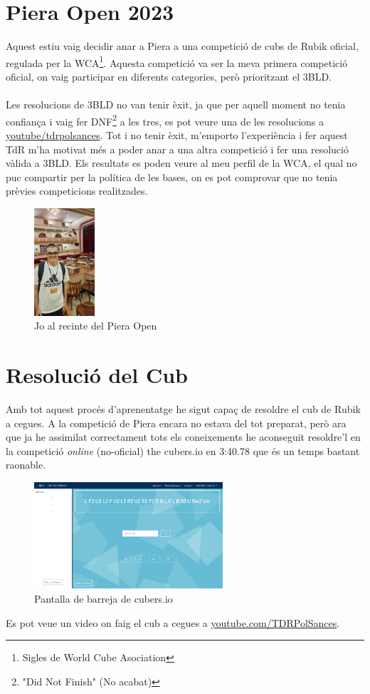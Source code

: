 \chapter{Piera Open 2023}

Aquest estiu vaig decidir anar a Piera a una competició de cubs de Rubik oficial, regulada per la WCA\footnote{Sigles de World Cube Asociation}. Aquesta competició va ser la meva primera competició oficial, on vaig participar en diferents categories, però prioritzant el 3BLD.
\\\\Les resolucions de 3BLD no van tenir èxit, ja que per aquell moment no tenia confiança i vaig fer DNF\footnote{"Did Not Finish" (No acabat)} a les tres, es pot veure una de les resolucions a \href{https://www.youtube.com/@TDRPolSances}{youtube/tdrpolsances}.
Tot i no tenir èxit, m'emporto l'experiència i fer aquest TdR m'ha motivat més a poder anar a una altra competició i fer una resolució vàlida a 3BLD. Els resultats es poden veure al meu perfil de la WCA, el qual no puc compartir per la política de les bases, on es pot comprovar que no tenia prèvies competicions realitzades.

\begin{figure}[!ht]
    \centering
    \includegraphics[width=0.2\textwidth]{img/figures/foto-piera.jpg}
    \caption{Jo al recinte del Piera Open}
    \label{fig:piera}
\end{figure}


\chapter{Resolució del Cub}

Amb tot aquest procés d'aprenentatge he sigut capaç de resoldre el cub de Rubik a cegues. A la competició de Piera encara no estava del tot preparat, però ara que ja he assimilat correctament tots els coneixements he aconseguit resoldre'l en la competició \textit{online} (no-oficial) the cubers.io en 3:40.78 que és un temps bastant raonable.

\begin{figure}[!h]
    \centering
    \includegraphics[width=7cm]{img/figures/captura-cubersio.png}
    \caption{Pantalla de barreja de cubers.io}
\end{figure}

Es pot veue un video on faig el cub a cegues a \href{https://www.youtube.com/channel/UCKCx79bCK7JOS4YsgLHbEgA}{youtube.com/TDRPolSances}.
